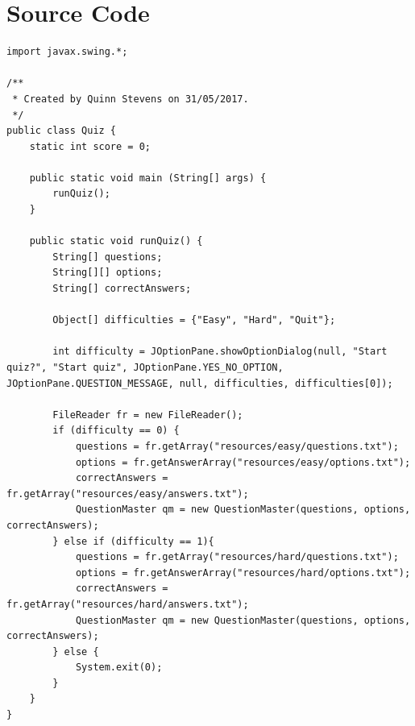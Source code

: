 \documentclass{report}
\begin{document}
	\chapter{Source Code}
\begin{verbatim}
import javax.swing.*;

/**
 * Created by Quinn Stevens on 31/05/2017.
 */
public class Quiz {
    static int score = 0;

    public static void main (String[] args) {
        runQuiz();
    }

    public static void runQuiz() {
        String[] questions;
        String[][] options;
        String[] correctAnswers;

        Object[] difficulties = {"Easy", "Hard", "Quit"};

        int difficulty = JOptionPane.showOptionDialog(null, "Start quiz?", "Start quiz", JOptionPane.YES_NO_OPTION, JOptionPane.QUESTION_MESSAGE, null, difficulties, difficulties[0]);

        FileReader fr = new FileReader();
        if (difficulty == 0) {
            questions = fr.getArray("resources/easy/questions.txt");
            options = fr.getAnswerArray("resources/easy/options.txt");
            correctAnswers = fr.getArray("resources/easy/answers.txt");
            QuestionMaster qm = new QuestionMaster(questions, options, correctAnswers);
        } else if (difficulty == 1){
            questions = fr.getArray("resources/hard/questions.txt");
            options = fr.getAnswerArray("resources/hard/options.txt");
            correctAnswers = fr.getArray("resources/hard/answers.txt");
            QuestionMaster qm = new QuestionMaster(questions, options, correctAnswers);
        } else {
            System.exit(0);
        }
    }
}
\end{verbatim}
\end{document}

